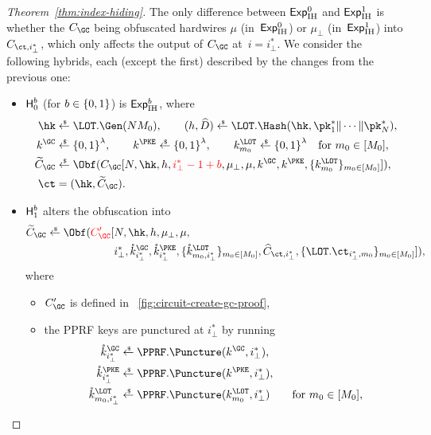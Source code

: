\begin{proof}
[%
Theorem~\ref{thm:index-hiding}]
The only difference between $\ExpIH{0}$ and $\ExpIH{1}$ is whether the $C_\GC$ being obfuscated hardwires $\mu$ (in~$\ExpIH{0}$) or $\mu_\bot$ (in~$\ExpIH{1}$) into $C_{\ct,i_\bot^\ast}$, which only affects the output of $C_\GC$ at~${i=i_\bot^\ast}$.
We consider the following hybrids, each (except the first) described by the changes from the previous one:
\begin{itemize}
\item $\Hyb_0^b$ (for ${b\in{\{0,1\}}}$) is $\ExpIH{b}$, where
\begin{align*}
\hk&{}\draws\LOT.\Gen(NM_0),\qquad
(h,\widehat{D})\draws\LOT.\Hash(\hk,\pk^\ast_1\concat\cdots\concat\pk^\ast_N),\\
k^\GC&{}\draws\bit^\lambda,\qquad
k^\PKE\draws\bit^\lambda,\qquad
k^\LOT_{m_0}\draws\bit^\lambda\quad\textup{for }m_0\in[M_0],\\
\widetilde{C}_\GC&{}\draws\Obf(C_\GC[
N,\hk,h,{\color{red}i_\bot^\ast-1+b},\mu_\bot,\mu,k^\GC,k^\PKE,\{k^\LOT_{m_0}\}_{m_0\in[M_0]}
]),\\
\ct&{}=(\hk,\widetilde{C}_\GC).
\end{align*}
\item $\Hyb_1^b$ alters the obfuscation into
\begin{align*}
\WideNarrow{}{\hspace*{-1.5em}}
\widetilde{C}_\GC\draws\Obf({\color{red}C_\GC'}[
{}&
N,\hk,h,\mu_\bot,\mu,
\\ &
i_\bot^\ast,
\mathring{k}^\GC_{i_\bot^\ast},
\mathring{k}^\PKE_{i_\bot^\ast},
\{\mathring{k}^\LOT_{m_0,i_\bot^\ast}\}_{m_0\in[M_0]},
\widehat{C}_{\ct,i_\bot^\ast},
\{\LOT.\ct_{i_\bot^\ast,m_0}\}_{m_0\in[M_0]}
]),
\end{align*}
where
\begin{itemize}
\item $C_\GC'$ is defined in \Figure~\ref{fig:circuit-create-gc-proof},
\item the PPRF keys are punctured at $i_\bot^\ast$ by running
\begin{align*}
\mathring{k}^\GC_{i_\bot^\ast}&{}\draws\PPRF.\Puncture(k^\GC,i_\bot^\ast),\\
\mathring{k}^\PKE_{i_\bot^\ast}&{}\draws\PPRF.\Puncture(k^\PKE,i_\bot^\ast),\\
\mathring{k}^\LOT_{m_0,i_\bot^\ast}&{}\draws\PPRF.\Puncture(k^\LOT_{m_0},i_\bot^\ast)
\qquad\textup{for }m_0\in[M_0],
\end{align*}

\end{itemize}
\end{itemize}
\end{proof}
